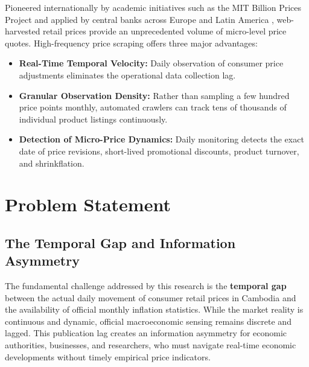 \hs Pioneered internationally by academic initiatives such as the MIT Billion Prices Project \citep{cavallo2016billion} and applied by central banks across Europe and Latin America \citep{macias2023nowcasting}, web-harvested retail prices provide an unprecedented volume of micro-level price quotes. High-frequency price scraping offers three major advantages:
\begin{itemize}
    \item \textbf{Real-Time Temporal Velocity:} Daily observation of consumer price adjustments eliminates the operational data collection lag.
    \item \textbf{Granular Observation Density:} Rather than sampling a few hundred price points monthly, automated crawlers can track tens of thousands of individual product listings continuously.
    \item \textbf{Detection of Micro-Price Dynamics:} Daily monitoring detects the exact date of price revisions, short-lived promotional discounts, product turnover, and shrinkflation.
\end{itemize}

\section{Problem Statement}

\subsection{The Temporal Gap and Information Asymmetry}
\hs The fundamental challenge addressed by this research is the \textbf{temporal gap} between the actual daily movement of consumer retail prices in Cambodia and the availability of official monthly inflation statistics. While the market reality is continuous and dynamic, official macroeconomic sensing remains discrete and lagged. This publication lag creates an information asymmetry for economic authorities, businesses, and researchers, who must navigate real-time economic developments without timely empirical price indicators.

